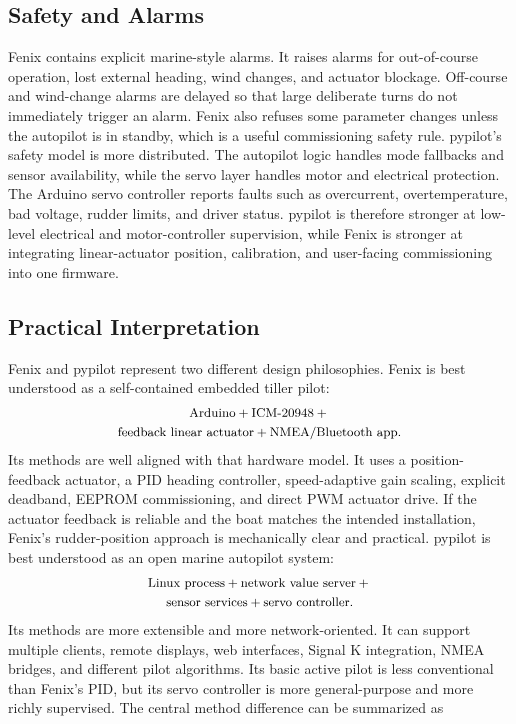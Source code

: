 \documentclass[11pt,twocolumn]{article}
\begin{document}
\subsection{Safety and Alarms}
Fenix contains explicit marine-style alarms.  It raises alarms for
out-of-course operation, lost external heading, wind changes, and actuator
blockage.  Off-course and wind-change alarms are delayed so that large
deliberate turns do not immediately trigger an alarm.  Fenix also refuses
some parameter changes unless the autopilot is in standby, which is a
useful commissioning safety rule.
pypilot's safety model is more distributed.  The autopilot logic handles
mode fallbacks and sensor availability, while the servo layer handles
motor and electrical protection.  The Arduino servo controller reports
faults such as overcurrent, overtemperature, bad voltage, rudder limits,
and driver status.  pypilot is therefore stronger at low-level electrical
and motor-controller supervision, while Fenix is stronger at integrating
linear-actuator position, calibration, and user-facing commissioning into
one firmware.
\subsection{Practical Interpretation}
Fenix and pypilot represent two different design philosophies.
Fenix is best understood as a self-contained embedded tiller pilot:
\[
\small
\begin{gathered}
\text{Arduino}+\text{ICM-20948}+{}\\
\text{feedback linear actuator}+\text{NMEA/Bluetooth app}.
\end{gathered}
\]
Its methods are well aligned with that hardware model.  It uses a
position-feedback actuator, a PID heading controller, speed-adaptive gain
scaling, explicit deadband, EEPROM commissioning, and direct PWM actuator
drive.  If the actuator feedback is reliable and the boat matches the
intended installation, Fenix's rudder-position approach is mechanically
clear and practical.
pypilot is best understood as an open marine autopilot system:
\[
\small
\begin{gathered}
\text{Linux process}+\text{network value server}+{}\\
\text{sensor services}+\text{servo controller}.
\end{gathered}
\]
Its methods are more extensible and more network-oriented.  It can support
multiple clients, remote displays, web interfaces, Signal K integration,
NMEA bridges, and different pilot algorithms.  Its basic active pilot is
less conventional than Fenix's PID, but its servo controller is more
general-purpose and more richly supervised.
The central method difference can be summarized as
\end{document}
